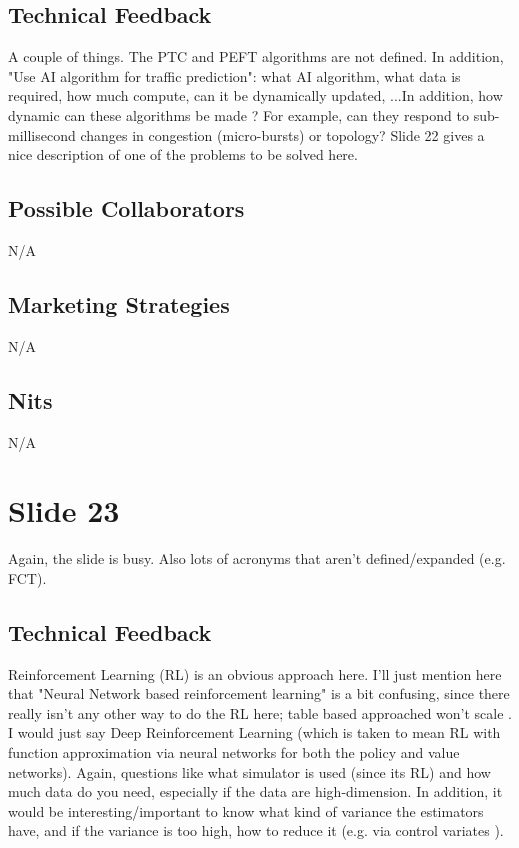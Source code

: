 \documentclass[11pt, oneside]{article}   	%
\begin{document}
\subsection{Technical Feedback}
\label{slide21:technical_feedback}
A couple of things. The PTC and PEFT algorithms are not defined. In addition, "Use AI algorithm for traffic prediction": what AI algorithm, what data is required, how much
compute, can it be dynamically updated, ...In addition, how dynamic can these algorithms be made \cite{Walraven:2016:TFO:2937770.2937891}?  For example, can they 
respond to sub-millisecond changes in congestion (micro-bursts) or topology? Slide 22 gives a nice description of one of the problems to be solved here.

\subsection{Possible Collaborators}
\label{slide21:possible_collaborators}
N/A

\subsection{Marketing Strategies}
\label{slide21:marketing_strategies}
N/A

\subsection{Nits}
\label{slide21:nits}
N/A


\section{Slide 23}
\label{sec:slide23}

Again, the slide is busy. Also lots of acronyms that aren't defined/expanded (e.g. FCT). 

\subsection{Technical Feedback}
\label{slide23:technical_feedback}

Reinforcement Learning (RL) is an obvious approach here. I'll just mention here that "Neural Network based reinforcement learning" is a bit confusing, since there
really isn't any other way to do the RL here; table based approached won't scale \cite{Melo:2008:ARL:1390156.1390240,}. I would just say Deep Reinforcement 
Learning (which is taken to mean RL with function approximation via neural networks for both the policy and value networks). Again, questions like what simulator is 
used (since its RL) and how much data do you need, especially if the data are high-dimension. In addition, it would be interesting/important to know what kind of 
variance the estimators have, and if the variance is too high, how to reduce it (e.g. via  control variates \cite{Andradottir:1993:VRT:174153.174154, 2016arXiv161101142G}).
\end{document}
